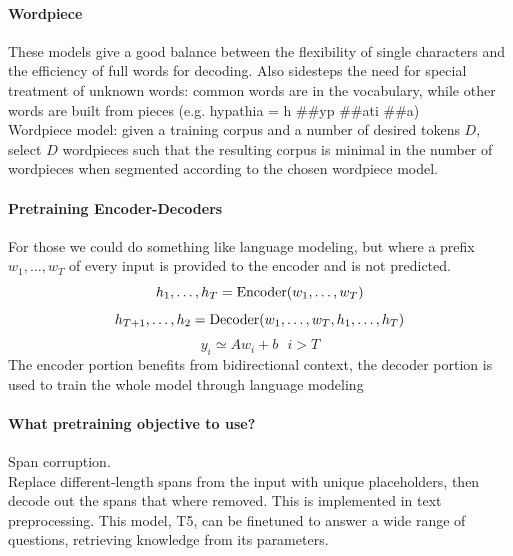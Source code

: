 \documentclass[10pt]{report}
\begin{document}
\paragraph{Wordpiece} These models give a good balance between the flexibility of single characters and the efficiency of full words for decoding. Also sidesteps the need for special treatment of unknown words: common words are in the vocabulary, while other words are built from pieces (e.g. hypathia = h \#\#yp \#\#ati \#\#a)\\
Wordpiece model: given a training corpus and a number of desired tokens $D$, select $D$ wordpieces such that the resulting corpus is minimal in the number of wordpieces when segmented according to the chosen wordpiece model.
\paragraph{Pretraining Encoder-Decoders} For those we could do something like language modeling, but where a prefix $w_1,\ldots,w_T$ of every input is provided to the encoder and is not predicted.
$$h_1,\ldots,h_T = \hbox{Encoder}(w_1,\ldots,w_T)$$
$$h_{T+1},\ldots,h_2 = \hbox{Decoder}(w_1,\ldots,w_T,h_1,\ldots,h_T)$$
$$y_i\simeq Aw_i+b\:\:\:i>T$$
The encoder portion benefits from bidirectional context, the decoder portion is used to train the whole model through language modeling
\paragraph{What pretraining objective to use?} Span corruption.\\
Replace different-length spans from the input with unique placeholders, then decode out the spans that where removed. This is implemented in text preprocessing. This model, T5, can be finetuned to answer a wide range of questions, retrieving knowledge from its parameters.
\end{document}
